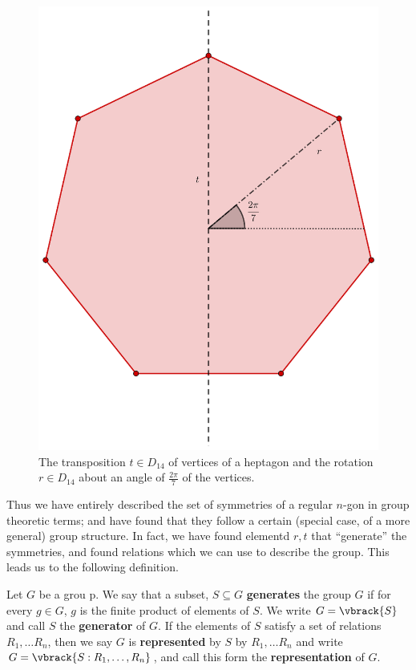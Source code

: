 \begin{figure}
    \centering
    \includegraphics[scale=0.2]{Figures/chapter1/D_14.eps}
    \caption{The transposition $t \in D_{14}$ of vertices of a heptagon and the
    rotation $r \in D_{14}$ about an angle of $\frac{2\pi}{7}$ of the vertices.}
    \label{fig_1.1}
\end{figure}

Thus we have entirely described the set of symmetries of a regular $n$-gon in
group theoretic terms; and have found that they follow a certain  (special case,
of a more general) group structure. In fact, we have found elementd $r,t$ that
``generate'' the symmetries, and found relations which we can use to describe
the group. This leads us to the following definition.

\begin{definition}
    Let $G$ be a grou p. We say that a subset, $S \subseteq G$
    \textbf{generates} the group $G$ if for every  $g \in G$,  $g$ is the finite
    product of elements of  $S$. We write  $G=\vbrack{S}$ and call $S$ the
    \textbf{generator} of $G$. If the elements of  $S$ satisfy a set of
    relations  $R_1, \dots R_n$, then we say $G$ is  \textbf{represented} by $S$
    by $R_1, \dots R_n$ and write $G=\vbrack{S : R_1, \dots, R_n}$, and call
    this form the \textbf{representation} of $G$.
\end{definition}

